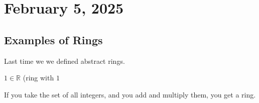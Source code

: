 \documentclass[11pt, draft]{article}
\begin{document}

\section{February 5, 2025}

\subsection{Examples of Rings}
Last time we we defined abstract rings.
\begin{remark}
    \(1 \in \mathbb{R}\) (ring with \(1\)
\end{remark}

\begin{fact}
    If you take the set of all integers, and you add and multiply them, you get a ring.
\end{fact}
\end{document}
